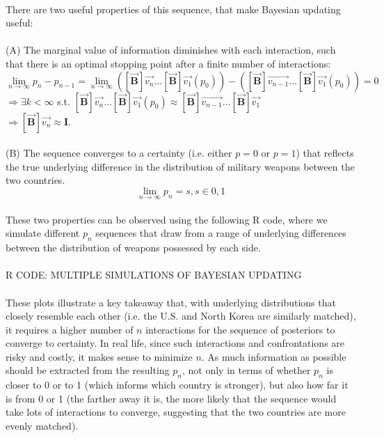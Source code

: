 \documentclass[12pt]{article}
\begin{document}
\begin{itemize}
\\
There are two useful properties of this sequence, that make Bayesian updating useful:\\
\\
(A) The marginal value of information diminishes with each interaction, such that there is an optimal stopping point after a finite number of interactions:\\
$$\lim_{n\to\infty} p_n-p_{n-1} = \lim_{n\to\infty} ([\vec{\mathbf{B}}] \vec{v_n} \dots [\vec{\mathbf{B}}] \vec{v_1} (p_0)) - ([\vec{\mathbf{B}}] \vec{v_{n-1}} \dots [\vec{\mathbf{B}}] \vec{v_1} (p_0)) = 0 $$
$\Rightarrow \exists k<\infty$ s.t. $[\vec{\mathbf{B}}] \vec{v_n} \dots [\vec{\mathbf{B}}] \vec{v_1} (p_0) \approx [\vec{\mathbf{B}}] \vec{v_{n-1}} \dots [\vec{\mathbf{B}}] \vec{v_1}$\\
$\Rightarrow [\vec{\mathbf{B}}] \vec{v_n} \approx \mathbf{I}$.\\
\\
(B) The sequence converges to a certainty (i.e. either $p=0$ or $p=1$) that reflects the true underlying difference in the distribution of military weapons between the two countries.\\
$$\lim_{n\to\infty} p_n = s,  s\in{0,1}$$
\\
These two properties can be observed using the following R code, where we simulate different $p_n$ sequences that draw from a range of underlying differences between the distribution of weapons possessed by each side.\\
\\
R CODE: MULTIPLE SIMULATIONS OF BAYESIAN UPDATING\\
\\
These plots illustrate a key takeaway that, with underlying distributions that closely resemble each other (i.e. the U.S. and North Korea are similarly matched), it requires a higher number of $n$ interactions for the sequence of posteriors to converge to certainty. In real life, since such interactions and confrontations are risky and costly, it makes sense to minimize $n$. As much information as possible should be extracted from the resulting $p_n$, not only in terms of whether $p_n$ is closer to 0 or to 1 (which informs which country is stronger), but also how far it is from 0 or 1 (the farther away it is, the more likely that the sequence would take lots of interactions to converge, suggesting that the two countries are more evenly matched).
\end{itemize}
\end{document}
